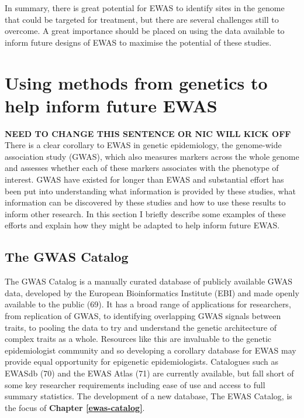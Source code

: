 \documentclass[11pt,twoside]{bristolthesis}
\begin{document}
In summary, there is great potential for EWAS to identify sites in the genome that could be targeted for treatment, but there are several challenges still to overcome. A great importance should be placed on using the data available to inform future designs of EWAS to maximise the potential of these studies.

\hypertarget{genetics-in-ewas}{%
\section{Using methods from genetics to help inform future EWAS}\label{genetics-in-ewas}}

\textbf{NEED TO CHANGE THIS SENTENCE OR NIC WILL KICK OFF} There is a clear corollary to EWAS in genetic epidemiology, the genome-wide association study (GWAS), which also measures markers across the whole genome and assesses whether each of these markers associates with the phenotype of interest. GWAS have existed for longer than EWAS and substantial effort has been put into understanding what information is provided by these studies, what information can be discovered by these studies and how to use these results to inform other research. In this section I briefly describe some examples of these efforts and explain how they might be adapted to help inform future EWAS.

\hypertarget{gwas-catalog}{%
\subsection{The GWAS Catalog}\label{gwas-catalog}}

The GWAS Catalog is a manually curated database of publicly available GWAS data, developed by the European Bioinformatics Institute (EBI) and made openly available to the public (69). It has a broad range of applications for researchers, from replication of GWAS, to identifying overlapping GWAS signals between traits, to pooling the data to try and understand the genetic architecture of complex traits as a whole. Resources like this are invaluable to the genetic epidemiologist community and so developing a corollary database for EWAS may provide equal opportunity for epigenetic epidemiologists. Catalogues such as EWASdb (70) and the EWAS Atlas (71) are currently available, but fall short of some key researcher requirements including ease of use and access to full summary statistics. The development of a new database, The EWAS Catalog, is the focus of \textbf{Chapter \ref{ewas-catalog}}.
\end{document}
